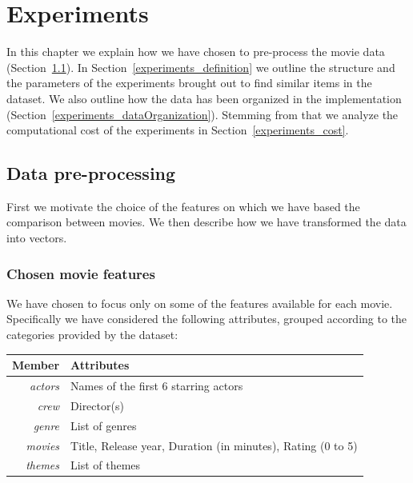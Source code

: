 \chapter{Experiments}\label{experiments}
In this chapter we explain how we have chosen to pre-process the movie data (Section~\ref{experiments_preProcessing}). In Section~\ref{experiments_definition} we outline the structure and the parameters of the experiments brought out to find similar items in the dataset. We also outline how the data has been organized in the implementation (Section~\ref{experiments_dataOrganization}). Stemming from that we analyze the computational cost of the experiments in Section~\ref{experiments_cost}.

\section{Data pre-processing}\label{experiments_preProcessing}
First we motivate the choice of the features on which we have based the comparison between movies. We then describe how we have transformed the data into vectors.
\subsection{Chosen movie features}\label{preProcessing_features}
We have chosen to focus only on some of the features available for each movie. Specifically we have considered the following attributes, grouped according to the categories provided by the dataset:
\begin{table}[h]
    \centering
    \begin{tabular}{rl}
        \toprule
        \textbf{Member} & \textbf{Attributes} \\ 
        \midrule
        \textit{actors}   & Names of the first 6 starring actors \\ 
        \textit{crew}     & Director(s) \\ 
        \textit{genre}    & List of genres \\ 
        \textit{movies}   & Title, Release year, Duration (in minutes), Rating (0 to 5) \\ 
        \textit{themes}   & List of themes \\ 
        \bottomrule
    \end{tabular}
    \label{tab:movie_info}
\end{table}

